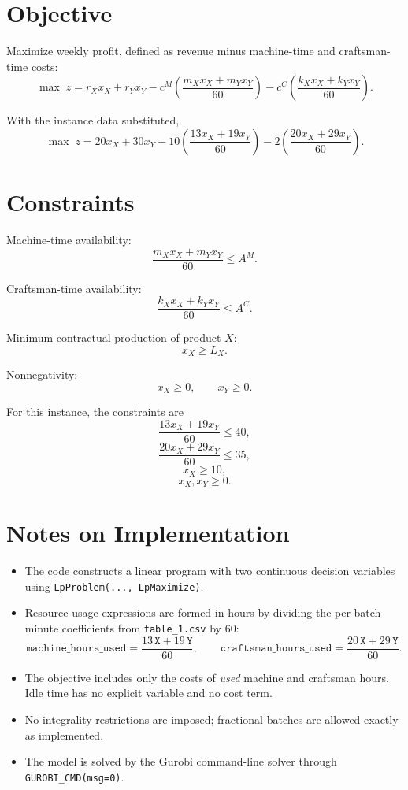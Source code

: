 \section*{Objective}

Maximize weekly profit, defined as revenue minus machine-time and craftsman-time costs:
\[
\max \; z
=
r_X x_X + r_Y x_Y
- c^{M}\left(\frac{m_X x_X + m_Y x_Y}{60}\right)
- c^{C}\left(\frac{k_X x_X + k_Y x_Y}{60}\right).
\]

With the instance data substituted,
\[
\max \; z
=
20x_X + 30x_Y
- 10\left(\frac{13x_X+19x_Y}{60}\right)
- 2\left(\frac{20x_X+29x_Y}{60}\right).
\]

\section*{Constraints}

Machine-time availability:
\[
\frac{m_X x_X + m_Y x_Y}{60} \le A^{M}.
\]

Craftsman-time availability:
\[
\frac{k_X x_X + k_Y x_Y}{60} \le A^{C}.
\]

Minimum contractual production of product $X$:
\[
x_X \ge L_X.
\]

Nonnegativity:
\[
x_X \ge 0,\qquad x_Y \ge 0.
\]

For this instance, the constraints are
\[
\frac{13x_X+19x_Y}{60} \le 40,
\]
\[
\frac{20x_X+29x_Y}{60} \le 35,
\]
\[
x_X \ge 10,
\]
\[
x_X,x_Y \ge 0.
\]

\section*{Notes on Implementation}

\begin{itemize}
    \item The code constructs a linear program with two continuous decision variables using \texttt{LpProblem(..., LpMaximize)}.
    \item Resource usage expressions are formed in hours by dividing the per-batch minute coefficients from \texttt{table\_1.csv} by $60$:
    \[
    \texttt{machine\_hours\_used}=\frac{13\,\texttt{X}+19\,\texttt{Y}}{60},\qquad
    \texttt{craftsman\_hours\_used}=\frac{20\,\texttt{X}+29\,\texttt{Y}}{60}.
    \]
    \item The objective includes only the costs of \emph{used} machine and craftsman hours. Idle time has no explicit variable and no cost term.
    \item No integrality restrictions are imposed; fractional batches are allowed exactly as implemented.
    \item The model is solved by the Gurobi command-line solver through \texttt{GUROBI\_CMD(msg=0)}.
\end{itemize}
